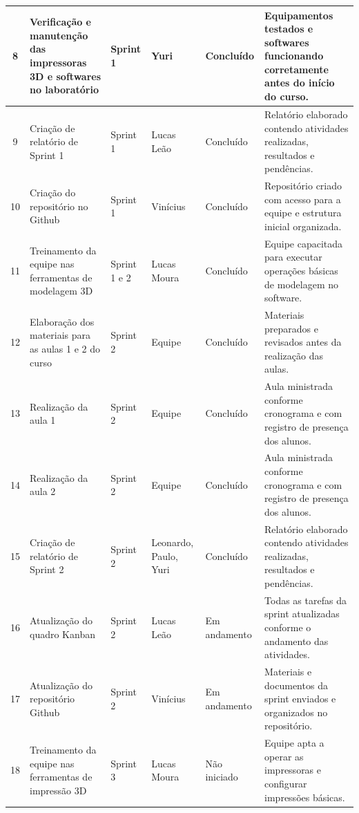 \documentclass[12pt,a4paper]{article}
\begin{document}
\begin{longtable}{|c|p{3.8cm}|p{1.9cm}|p{2.2cm}|p{1.7cm}|p{4.2cm}|}
8 & Verificação e manutenção das impressoras 3D e softwares no laboratório & Sprint 1 & Yuri & Concluído & Equipamentos testados e softwares funcionando corretamente antes do início do curso. \\ \hline

9 & Criação de relatório de Sprint 1 & Sprint 1 & Lucas Leão & Concluído & Relatório elaborado contendo atividades realizadas, resultados e pendências. \\ \hline

10 & Criação do repositório no Github & Sprint 1 & Vinícius & Concluído & Repositório criado com acesso para a equipe e estrutura inicial organizada. \\ \hline

11 & Treinamento da equipe nas ferramentas de modelagem 3D & Sprint 1 e 2 & Lucas Moura & Concluído & Equipe capacitada para executar operações básicas de modelagem no software. \\ \hline

12 & Elaboração dos materiais para as aulas 1 e 2 do curso & Sprint 2 & Equipe & Concluído & Materiais preparados e revisados antes da realização das aulas. \\ \hline

13 & Realização da aula 1 & Sprint 2 & Equipe & Concluído & Aula ministrada conforme cronograma e com registro de presença dos alunos. \\ \hline

14 & Realização da aula 2 & Sprint 2 & Equipe & Concluído & Aula ministrada conforme cronograma e com registro de presença dos alunos. \\ \hline

15 & Criação de relatório de Sprint 2 & Sprint 2 & Leonardo, Paulo, Yuri & Concluído & Relatório elaborado contendo atividades realizadas, resultados e pendências. \\ \hline

16 & Atualização do quadro Kanban & Sprint 2 & Lucas Leão & Em andamento & Todas as tarefas da sprint atualizadas conforme o andamento das atividades. \\ \hline

17 & Atualização do repositório Github & Sprint 2 & Vinícius & Em andamento & Materiais e documentos da sprint enviados e organizados no repositório. \\ \hline

18 & Treinamento da equipe nas ferramentas de impressão 3D & Sprint 3 & Lucas Moura & Não iniciado & Equipe apta a operar as impressoras e configurar impressões básicas. \\ \hline


\end{longtable}
\end{document}
